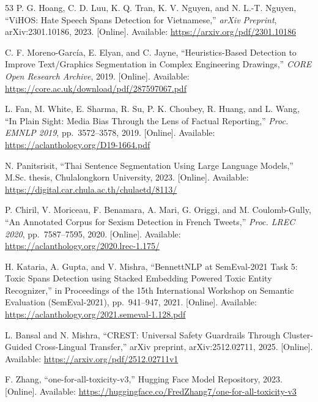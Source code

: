 \documentclass[12pt,oneside,openright,a4paper]{cpe-english-project}
\begin{document}
\begin{thebibliography}{53}
\hypertarget{bib:ref41}{} P. G. Hoang, C. D. Luu, K. Q. Tran, K. V. Nguyen, and N. L.-T.
Nguyen, ``ViHOS: Hate Speech Spans Detection for Vietnamese,''
\emph{arXiv Preprint}, arXiv:2301.10186, 2023. {[}Online{]}. Available:
\url{https://arxiv.org/pdf/2301.10186}

\hypertarget{bib:ref42}{} C. F. Moreno-García, E. Elyan, and C. Jayne, ``Heuristics-Based
Detection to Improve Text/Graphics Segmentation in Complex Engineering
Drawings,'' \emph{CORE Open Research Archive}, 2019. {[}Online{]}.
Available: \url{https://core.ac.uk/download/pdf/287597067.pdf}

\hypertarget{bib:ref43}{} L. Fan, M. White, E. Sharma, R. Su, P. K. Choubey, R. Huang,
and L. Wang, ``In Plain Sight: Media Bias Through the Lens of Factual
Reporting,'' \emph{Proc. EMNLP 2019}, pp.~3572--3578, 2019.
{[}Online{]}. Available: \url{https://aclanthology.org/D19-1664.pdf}

\hypertarget{bib:ref44}{} N. Panitsrisit, ``Thai Sentence Segmentation Using Large
Language Models,'' M.Sc. thesis, Chulalongkorn University, 2023.
{[}Online{]}. Available:
\url{https://digital.car.chula.ac.th/chulaetd/8113/}

\hypertarget{bib:ref45}{} P. Chiril, V. Moriceau, F. Benamara, A. Mari, G. Origgi, and M.
Coulomb-Gully, ``An Annotated Corpus for Sexism Detection in French
Tweets,'' \emph{Proc. LREC 2020}, pp.~7587--7595, 2020. {[}Online{]}.
Available: \url{https://aclanthology.org/2020.lrec-1.175/}

\hypertarget{bib:ref46}{} H. Kataria, A. Gupta, and V. Mishra, ``BennettNLP at
SemEval-2021 Task 5: Toxic Spans Detection using Stacked Embedding
Powered Toxic Entity Recognizer,'' in Proceedings of the 15th
International Workshop on Semantic Evaluation (SemEval-2021),
pp.~941--947, 2021. {[}Online{]}. Available:
\url{https://aclanthology.org/2021.semeval-1.128.pdf}

\hypertarget{bib:ref47}{} L. Bansal and N. Mishra, ``CREST: Universal Safety Guardrails
Through Cluster-Guided Cross-Lingual Transfer,'' arXiv preprint,
arXiv:2512.02711, 2025. {[}Online{]}. Available:
\url{https://arxiv.org/pdf/2512.02711v1}

\hypertarget{bib:ref48}{} F. Zhang, ``one-for-all-toxicity-v3,'' Hugging Face Model
Repository, 2023. {[}Online{]}. Available:
\url{https://huggingface.co/FredZhang7/one-for-all-toxicity-v3}


\end{thebibliography}
\end{document}
